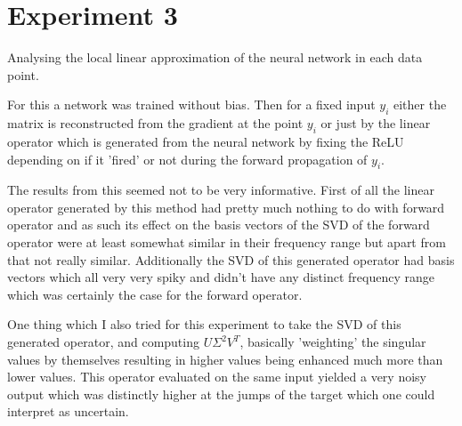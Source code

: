 \documentclass{article}
\begin{document}
\section*{Experiment 3}
Analysing the local linear approximation of the neural network in each data point.\\
\par
For this a network was trained without bias.
Then for a fixed input $y_i$ either the matrix is reconstructed from the gradient at the point $y_i$ or just by the linear operator which is generated from the neural network by fixing the ReLU depending on if it 'fired' or not during the forward propagation of $y_i$.\\
\par
The results from this seemed not to be very informative.
First of all the linear operator generated by this method had pretty much nothing to do with forward operator and as such its effect on the basis vectors of the SVD of the forward operator were at least somewhat similar in their frequency range but apart from that not really similar. Additionally the SVD of this generated operator had basis vectors which all very very spiky and didn't have any distinct frequency range which was certainly the case for the forward operator.\
\par
One thing which I also tried for this experiment to take the SVD of this generated operator, and computing $U\Sigma^2 V^T$, basically 'weighting' the singular values by themselves resulting in higher values being enhanced much more than lower values.
This operator evaluated on the same input yielded a very noisy output which was distinctly higher at the jumps of the target which one could interpret as uncertain.
\end{document}
